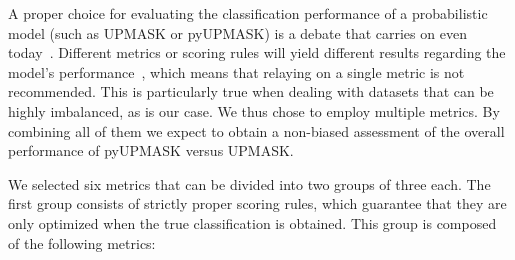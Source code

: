 \documentclass{aa}
\begin{document}


 A proper choice for evaluating the classification performance of a
 probabilistic model (such as UPMASK or pyUPMASK) is a debate that carries on
 even today~\citep{Hand_2009,hernandez_2012}. Different metrics or scoring
 rules will yield different results regarding the model's
 performance~\citep{Merkle_2013}, which means that relaying on a single metric
 is not recommended. This is particularly true when dealing with datasets that
 can be highly imbalanced, as is our case. We thus chose to employ multiple
 metrics. By combining all of them we expect to obtain a non-biased
 assessment of the overall performance of pyUPMASK versus UPMASK.

 We selected six metrics that can be divided into two groups of three each.
 The first group consists of strictly proper scoring rules, which
 guarantee that they are only optimized when the true classification is
 obtained. This group is composed of the following metrics:\\

\end{document}
